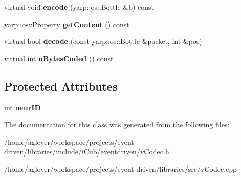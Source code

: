 \begin{DoxyCompactItemize}
\item 
virtual void {\bfseries encode} (yarp\+::os\+::\+Bottle \&b) const \hypertarget{classev_1_1NeuronIDEvent_a6b2fcf1d4e19bf5c281562764cdd2cbe}{}\label{classev_1_1NeuronIDEvent_a6b2fcf1d4e19bf5c281562764cdd2cbe}

\item 
yarp\+::os\+::\+Property {\bfseries get\+Content} () const \hypertarget{classev_1_1NeuronIDEvent_abef9ad9b422ac7740f6744bd7c800414}{}\label{classev_1_1NeuronIDEvent_abef9ad9b422ac7740f6744bd7c800414}

\item 
virtual bool {\bfseries decode} (const yarp\+::os\+::\+Bottle \&packet, int \&pos)\hypertarget{classev_1_1NeuronIDEvent_ae4ab33a0b6fdaa77a8d938d903da19ee}{}\label{classev_1_1NeuronIDEvent_ae4ab33a0b6fdaa77a8d938d903da19ee}

\item 
virtual int {\bfseries n\+Bytes\+Coded} () const \hypertarget{classev_1_1NeuronIDEvent_ad5281fe1a0e4da49adfb5f1110756eec}{}\label{classev_1_1NeuronIDEvent_ad5281fe1a0e4da49adfb5f1110756eec}

\end{DoxyCompactItemize}
\subsection*{Protected Attributes}
\begin{DoxyCompactItemize}
\item 
int {\bfseries neur\+ID}\hypertarget{classev_1_1NeuronIDEvent_a6d52d929d7194a617a07a954e1ba3fa8}{}\label{classev_1_1NeuronIDEvent_a6d52d929d7194a617a07a954e1ba3fa8}

\end{DoxyCompactItemize}


The documentation for this class was generated from the following files\+:\begin{DoxyCompactItemize}
\item 
/home/aglover/workspace/projects/event-\/driven/libraries/include/i\+Cub/eventdriven/v\+Codec.\+h\item 
/home/aglover/workspace/projects/event-\/driven/libraries/src/v\+Codec.\+cpp\end{DoxyCompactItemize}
